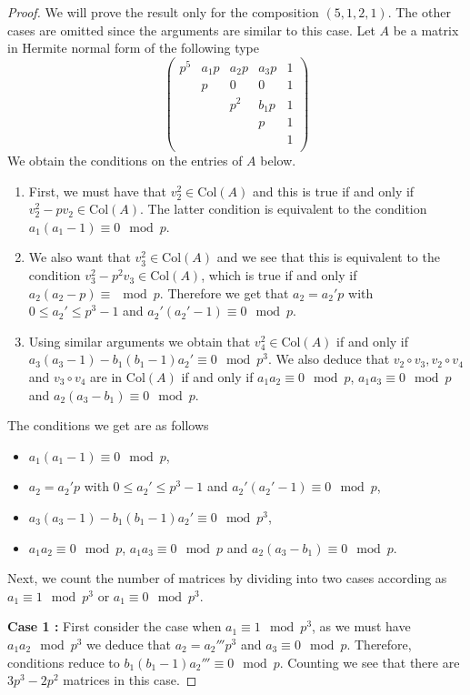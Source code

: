 \documentclass[a4paper]{amsart}
\numberwithin{equation}{section}
\theoremstyle{remark}
\renewcommand{\Col}{\mathrm{Col}}
\begin{document}
\begin{proof}
We will prove the result only for the composition $(5,1,2,1)$. The other cases are omitted since the arguments are similar to this case. Let $A$ be a matrix in Hermite normal form of the following type
\[
\begin{pmatrix}
        p^5 & a_1p & a_2p & a_3p & 1\\
         & p & 0 & 0 & 1\\
          & & p^2 & b_1p & 1\\
          &&& p & 1\\
          &&&& 1\\
\end{pmatrix}\]
    We obtain the conditions on the entries of $A$ below.
    \begin{enumerate}
        \item First, we must have that $v_2^2 \in \Col(A)$ and this is true if and only if $v_2^2-pv_2 \in \Col(A)$. The latter condition is equivalent to the condition $a_1(a_1-1) \equiv 0 \mod p$.
        \item We also want that $v_3^2 \in \Col(A)$ and we see that this is equivalent to the condition $v_3^2-p^2v_3 \in \Col(A)$, which is true if and only if $a_2(a_2-p) \equiv \mod p$. Therefore we get that $a_2 = a_2'p$ with $0 \leq a_2' \leq p^3-1$ and $a_2'(a_2'-1) \equiv 0 \mod p$.
        \item Using similar arguments we obtain that $v_4^2 \in \Col(A)$ if and only if $a_3(a_3-1)-b_1(b_1-1)a_2' \equiv 0 \mod p^3$. We also deduce that $v_2\circ v_3, v_2\circ v_4$ and $v_3\circ v_4$ are in $\Col(A)$ if and only if $a_1a_2 \equiv 0 \mod p$, $a_1a_3 \equiv 0 \mod p$ and $a_2(a_3-b_1) \equiv 0 \mod p$.
    \end{enumerate}
    The conditions we get are as follows
    \begin{itemize}
        \item $a_1(a_1-1) \equiv 0 \mod p$,
        \item $a_2 = a_2'p$ with $0 \leq a_2' \leq p^3-1$ and $a_2'(a_2'-1) \equiv 0 \mod p$,
        \item $a_3(a_3-1)-b_1(b_1-1)a_2' \equiv 0 \mod p^3$,
        \item $a_1a_2 \equiv 0 \mod p$, $a_1a_3 \equiv 0 \mod p$ and $a_2(a_3-b_1) \equiv 0 \mod p$.
    \end{itemize}
    Next, we count the number of matrices by dividing into two cases according as $a_1 \equiv 1 \mod p^3$ or $a_1 \equiv 0 \mod p^3$.
    \par \textbf{Case 1 :} First consider the case when $a_1 \equiv 1 \mod p^3$, as we must have $a_1a_2 \mod p^3$ we deduce that $a_2 = a_2'''p^3$ and $a_3 \equiv 0 \mod p$. Therefore, conditions reduce to $b_1(b_1-1)a_2''' \equiv 0 \mod p$. Counting we see that there are $3p^3-2p^2$ matrices in this case.

\end{proof}
\end{document}
